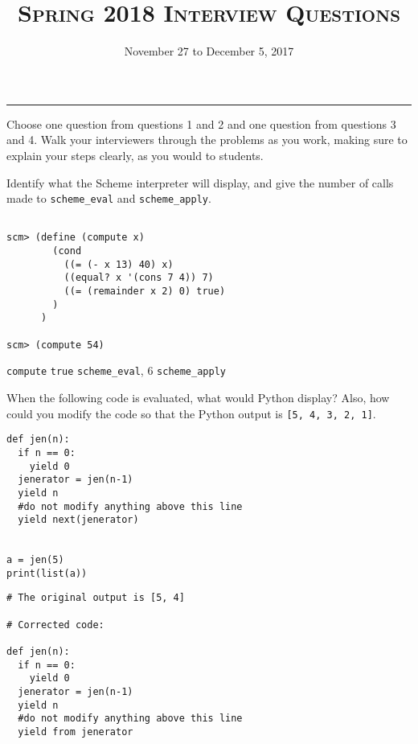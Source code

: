 \documentclass{exam}
\title{\textsc{Spring 2018 Interview Questions}}
\date{November 27 to December 5, 2017}
\begin{document}
\maketitle
\rule{\textwidth}{0.15em}
\fontsize{12}{15}\selectfont

Choose one question from questions 1 and 2 and one question from questions 3 and 4. Walk your interviewers through the problems as you work, making sure to explain your steps clearly, as you would to students.

\begin{questions}

\begin{blocksection}
\question Identify what the Scheme interpreter will display, and give the number of calls made to \lstinline$scheme_eval$ and \lstinline$scheme_apply$.
\begin{lstlisting}

scm> (define (compute x) 
        (cond 
          ((= (- x 13) 40) x) 
          ((equal? x '(cons 7 4)) 7) 
          ((= (remainder x 2) 0) true)
        )
      )

scm> (compute 54)

\end{lstlisting}

\begin{solution}
\lstinline$compute$ \linebreak
\lstinline$true$  \lstinline$scheme_eval$, 6 \lstinline$scheme_apply$
\end{solution}

\end{blocksection}

\begin{blocksection}
\question When the following code is evaluated, what would Python display? Also, how could you modify the code so that the Python output is \lstinline$[5, 4, 3, 2, 1]$. 
\begin{lstlisting}
def jen(n):
  if n == 0:
    yield 0
  jenerator = jen(n-1)
  yield n
  #do not modify anything above this line
  yield next(jenerator)
  

a = jen(5)
print(list(a))
\end{lstlisting}

\begin{solution}
\begin{lstlisting}
# The original output is [5, 4]

# Corrected code: 

def jen(n):
  if n == 0:
    yield 0
  jenerator = jen(n-1)
  yield n
  #do not modify anything above this line
  yield from jenerator


\end{lstlisting}
\end{solution}
\end{blocksection}
\end{questions}
\end{document}
